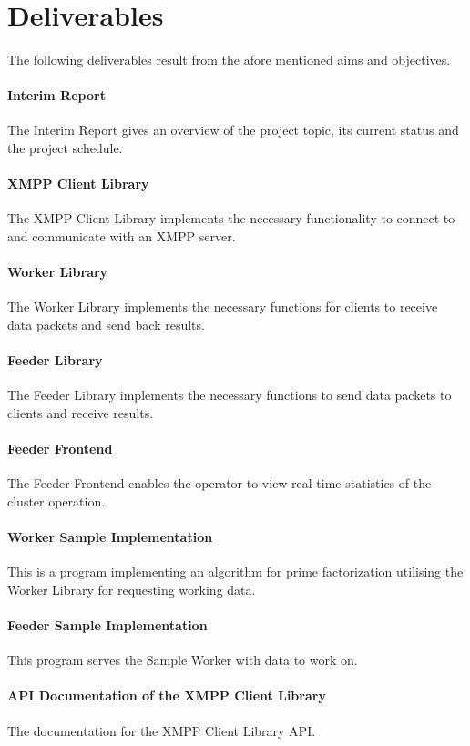 \section{Deliverables}
\paragraph{}
The following deliverables result from the afore mentioned aims and objectives.

\paragraph{Interim Report} The Interim Report gives an overview of the project topic, its current status and the project schedule.
\paragraph{XMPP Client Library} The XMPP Client Library implements the necessary functionality to connect to and communicate with an XMPP server.
\paragraph{Worker Library} The Worker Library implements the necessary functions for clients to receive data packets and send back results.
\paragraph{Feeder Library} The Feeder Library implements the necessary functions to send data packets to clients and receive results.
\paragraph{Feeder Frontend} The Feeder Frontend enables the operator to view real-time statistics of the cluster operation.
\paragraph{Worker Sample Implementation} This is a program implementing an algorithm for prime factorization utilising the Worker Library for requesting working data.
\paragraph{Feeder Sample Implementation} This program serves the Sample Worker with data to work on.
\paragraph{API Documentation of the XMPP Client Library} The documentation for the XMPP Client Library API.
